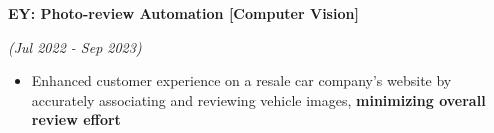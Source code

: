 \documentclass[a4paper,10pt]{article}
\newcommand{\isep}{-2 pt}
\begin{document}
\begin{itemize}
{\begin{itemize}


    \end{itemize}

\item \textbf{EY: Photo-review Automation [Computer Vision]}  \hfill {\emph{(Jul 2022 - Sep 2023)}\\[-0.6cm]
    \begin{itemize}\itemsep \isep
        \item Enhanced customer experience on a resale car company's website by accurately associating and reviewing vehicle images, \textbf{minimizing overall review effort}


\end{itemize}}}
\end{itemize}
\end{document}
